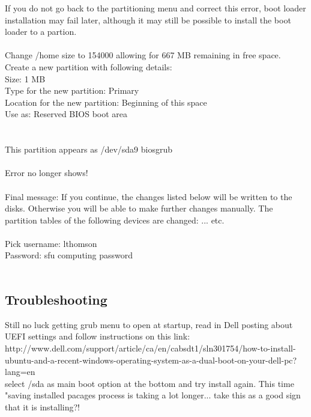 \documentclass[]{article}
\begin{document}
If you do not go back to the partitioning menu and correct this error, boot loader installation may fail later, although it may still be possible to install the boot loader to a partion.\\
\\
Change /home size to 154000 allowing for 667 MB remaining in free space. Create a new partition with following details:\\
Size: 1 MB\\
Type for the new partition: Primary\\
Location for the new partition: Beginning of this space\\
Use as: Reserved BIOS boot area\\\\
\\
This partition appears as /dev/sda9 biosgrub\\
\\
Error no longer shows!\\
\\
Final message: If you continue, the changes listed below will be written to the disks. Otherwise you will be able to make further changes manually. The partition tables of the following devices are changed: ... etc.\\ \\
Pick username: lthomson\\
Password: sfu computing password\\
\\
\subsection{Troubleshooting}
Still no luck getting grub menu to open at startup, read in Dell posting about UEFI settings and follow instructions on this link: http://www.dell.com/support/article/ca/en/cabsdt1/sln301754/how-to-install-ubuntu-and-a-recent-windows-operating-system-as-a-dual-boot-on-your-dell-pc?lang=en\\
select /sda as main boot option at the bottom and try install again. This time "saving installed pacages process is taking a lot longer... take this as a good sign that it is installing?!
\end{document}
